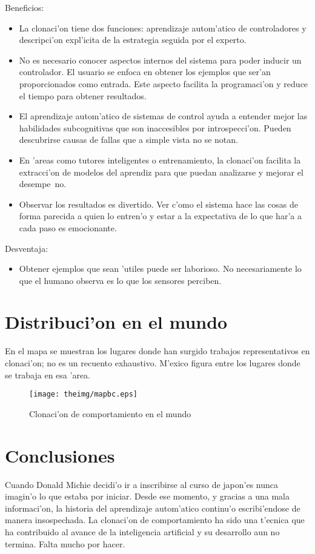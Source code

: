 \documentclass[11pt]{article}
\begin{document}
Beneficios:
\begin{itemize}
\item La clonaci'on tiene dos funciones: aprendizaje autom'atico de controladores y descripci'on expl'icita de la estrategia seguida por el experto.
\item No es necesario conocer aspectos internos del sistema para poder inducir un controlador. El usuario se enfoca en obtener los ejemplos que ser'an proporcionados como entrada. Este aspecto facilita la programaci'on y reduce el tiempo para obtener resultados.
\item El aprendizaje autom'atico de sistemas de control ayuda a entender mejor las habilidades subcognitivas que son inaccesibles por introspecci'on. Pueden descubrirse causas de fallas que a simple vista no se notan.
\item En 'areas como tutores inteligentes o entrenamiento, la clonaci'on facilita la extracci'on de modelos del aprendiz para que puedan analizarse y mejorar el desempe~no.
\item Observar los resultados es divertido. Ver c'omo el sistema hace las cosas de forma parecida a quien lo entren'o y estar a la expectativa de lo que har'a a cada paso es emocionante.
\end{itemize}

Desventaja:
\begin{itemize}
\item Obtener ejemplos que sean 'utiles puede ser laborioso. No necesariamente lo que el humano observa es lo que los sensores perciben.
\end{itemize}


\section{Distribuci'on en el mundo}
En el mapa se muestran los lugares donde han surgido trabajos representativos en clonaci'on; no es un recuento exhaustivo. M'exico figura entre los lugares donde se trabaja en esa 'area. 
\begin{figure}[h]

\centering

\texttt{[image: theimg/mapbc.eps]}

\caption[Clonaci'on de comportamiento en el mundo]{Clonaci'on de comportamiento en el mundo} 
\label{fig:bcmapa}

\end{figure}

\section{Conclusiones}
Cuando Donald Michie decidi'o ir a inscribirse al curso de japon'es nunca imagin'o lo que estaba por iniciar. Desde ese momento, y gracias a una mala informaci'on, la historia del aprendizaje autom'atico continu'o escribi'endose de manera insospechada. La clonaci'on de comportamiento ha sido una t'ecnica que ha contribuido al avance de la inteligencia artificial y su desarrollo aun no termina. Falta mucho por hacer.



\end{document}
